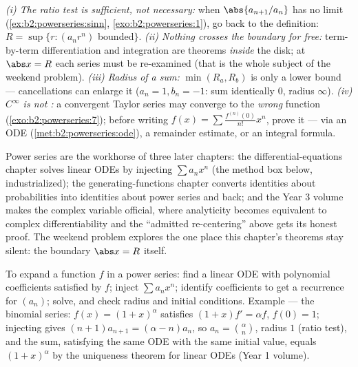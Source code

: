 \begin{remark}
\emph{(i) The ratio test is sufficient, not necessary:} when
$\abs{a_{n+1}/a_n}$ has no limit
(\cref{ex:b2:powerseries:sinn}, \cref{exo:b2:powerseries:1}),
go back to the definition: $R = \sup\{r : (a_nr^n)$
bounded$\}$. \emph{(ii) Nothing crosses the boundary for free:}
term-by-term differentiation and integration are theorems
\emph{inside} the  disk; at $\abs x = R$ each series must
be re-examined (that is the whole subject of the weekend
problem). \emph{(iii) Radius of a sum:} $\min(R_a, R_b)$ is
only a lower bound --- cancellations can enlarge it ($a_n = 1,
b_n = -1$: sum identically $0$, radius $\infty$). \emph{(iv)
$C^\infty$ is not :} a convergent Taylor series may
converge to the \emph{wrong} function
(\cref{exo:b2:powerseries:7}); before writing $f(x) = \sum
\frac{f^{(n)}(0)}{n!}x^n$, prove it --- via an ODE
(\cref{met:b2:powerseries:ode}), a remainder estimate, or an
integral formula.
\end{remark}

\begin{remark}
Power series are the workhorse of three later chapters: the
differential-equations chapter solves linear ODEs by injecting
$\sum a_nx^n$ (the method box below, industrialized); the
generating-functions chapter converts identities about
probabilities into identities about power series and back; and
the Year 3 volume makes the complex variable official, where
analyticity becomes equivalent to complex differentiability and
the ``admitted re-centering'' above gets its honest proof. The
weekend problem explores the one place this chapter's theorems
stay silent: the boundary $\abs x = R$ itself.
\end{remark}

\begin{method}\label{met:b2:powerseries:ode}
To expand a function $f$ in a power series: find a linear ODE with
polynomial coefficients satisfied by $f$; inject $\sum a_nx^n$;
identify coefficients to get a recurrence for $(a_n)$; solve, and
check radius and initial conditions. Example --- the binomial
series: $f(x) = (1+x)^\alpha$ satisfies $(1+x)f' = \alpha f$, $f(0)
= 1$; injecting gives $(n+1)a_{n+1} = (\alpha - n)a_n$, so $a_n =
\binom{\alpha}{n}$, radius $1$ (ratio test), and the sum, satisfying
the same ODE with the same initial value, equals $(1 + x)^\alpha$
by the uniqueness theorem for linear ODEs (Year 1 volume).
\end{method}

